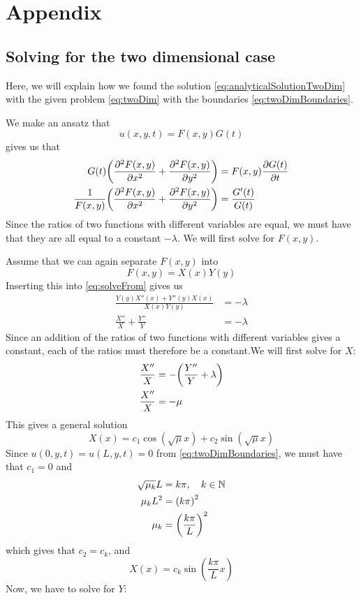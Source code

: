 
\appendix
\section*{Appendix}
\renewcommand{\thesubsection}{\Alph{subsection}}
\subsection{Solving for the two dimensional case}\label{twodimappendix}
Here, we will explain how we found the solution \vref{eq:analyticalSolutionTwoDim} with the given problem \vref{eq:twoDim} with the boundaries \vref{eq:twoDimBoundaries}.


We make an ansatz that
\[
u(x,y,t) = F(x,y)G(t)
\]
 gives us that
\begin{align}
G(t)\qty(\pdv[2]{F(x,y)}{x}+ \pdv[2]{F(x,y)}{y} ) &= F(x,y)\pdv{G(t)}{t} \nonumber\\
\frac{1}{F(x,y)}\qty(\pdv[2]{F(x,y)}{x}+ \pdv[2]{F(x,y)}{y} ) &= \frac{G'(t)}{G(t)} \label{eq:solveFrom}
\end{align}
Since the ratios of two functions with different variables are equal, we must have that they are all equal to a constant \(-\lambda\). We will first solve for \(F(x,y)\).

Assume that we can again separate \(F(x,y)\) into
\[
F(x,y) = X(x)Y(y)
\]
Inserting this into \vref{eq:solveFrom} gives us
\begin{align*}
\frac{Y(y)X''(x)+ Y''(y)X(x)}{X(x)Y(y)} &= -\lambda \\
\frac{X''}{X}+ \frac{Y''}{Y} &= -\lambda
\end{align*}
Since an addition of the ratios of two functions with different variables gives a constant, each of the ratios must therefore be a constant.We will first solve for \(X\):
\begin{align}
\frac{X''}{X} &= -\qty(\frac{Y''}{Y} +\lambda) \label{eq:mysteriousMu}\\
\frac{X''}{X} &= -\mu \nonumber
\end{align}
This gives a general solution
\[
X(x) = c_1\cos(\sqrt{\mu}x) + c_2\sin(\sqrt{\mu}x)
\]
Since \(u(0,y,t) = u(L,y,t) = 0\) from \vref{eq:twoDimBoundaries}, we must have that \(c_1 = 0\) and
\begin{align}
\sqrt{\mu_k}L &= k\pi \nonumber , \quad k \in \mathbb{N}\\
\mu_k L^2 &= \qty(k\pi)^2 \nonumber \\
 \mu_k  &=\qty(\frac{k\pi}{L})^2 \label{eq:twoDimMu}
\end{align}
which gives that \(c_2 = c_k\), and
\[
X(x) = c_k\sin(\frac{k\pi}{L}x)
\]
Now, we have to solve for \(Y\):

